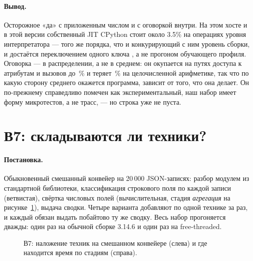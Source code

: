 \paragraph{Вывод.} Осторожное «да» с приложенным числом и с оговоркой внутри. На этом хосте и в
этой версии собственный JIT CPython стоит около 3.5\% на операциях уровня интерпретатора --- того
же порядка, что и конкурирующий с ним уровень сборки, и достаётся переключением одного
ключа , а не прогоном обучающего профиля. Оговорка --- в распределении, а не в
среднем: он окупается на путях доступа к атрибутам и вызовов до \,\% и теряет \,\% на
целочисленной арифметике, так что по какую сторону среднего окажется программа, зависит от того,
что она делает. Он по-прежнему справедливо помечен как экспериментальный, наш набор имеет форму
микротестов, а не трасс, --- но строка уже не пуста.

\section{В7: складываются ли техники?}
\label{sec:rq7}


\paragraph{Постановка.} Обыкновенный смешанный конвейер на 20\,000 JSON-записях: разбор модулем
 из стандартной библиотеки, классификация строкового поля по каждой записи (ветвистая),
свёртка числовых полей (вычислительная, стадия \emph{агрегация} на
рисунке~\ref{fig:pipeline}), выдача сводки. Четыре варианта добавляют по одной технике
за раз, и каждый обязан выдать побайтово ту же сводку. Весь набор прогоняется дважды: один раз на
обычной сборке 3.14.6 и один раз на free-threaded.

\begin{figure}[t]
  \centering
  \caption{В7: наложение техник на смешанном конвейере (слева) и где находится время по стадиям
    (справа).}
  \label{fig:pipeline}
\end{figure}

